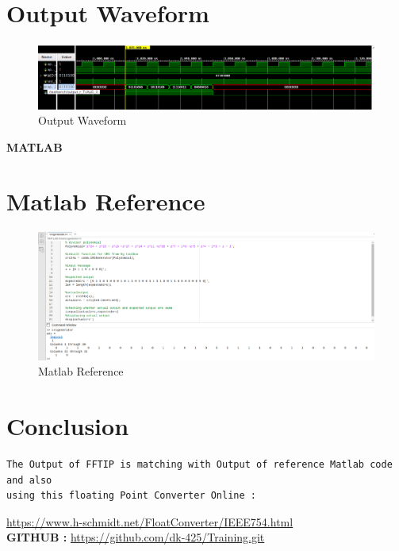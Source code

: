 \documentclass{article}
\begin{document}
\vspace{3cm}


\section{Output Waveform}
\vspace{1cm}
\begin{figure}[h]
\centering
\includegraphics[width=\columnwidth]{figs/p1wav.png}
    \caption{Output Waveform}
    \label{fig:my_label}
\end{figure}
\vspace{15cm}

\maketitle
\hfill \textbf{MATLAB}
\section{Matlab Reference}
\begin{figure}[h]
\centering
\includegraphics[width=\columnwidth]{figs/actual_matlab.png}
    \caption{Matlab Reference}
    \label{fig:my_label}
\end{figure}
\vspace{3cm}
\section{Conclusion}
\begin{lstlisting}
The Output of FFTIP is matching with Output of reference Matlab code and also
using this floating Point Converter Online :

\end{lstlisting}
\url{https://www.h-schmidt.net/FloatConverter/IEEE754.html}
\vspace{4cm}
\\
\textbf{GITHUB :} \url{https://github.com/dk-425/Training.git}
\end{document}
